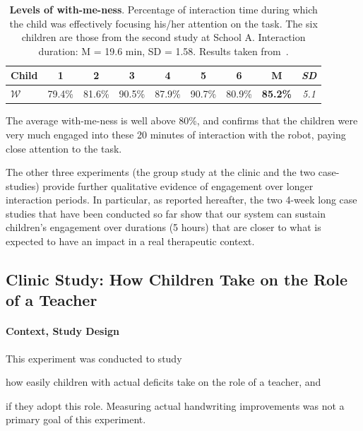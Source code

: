 \documentclass{article}
\begin{document}
\begin{table}[h!]
    \centering
    \caption{\textbf{Levels of with-me-ness}. Percentage of interaction time
        during which the child was effectively focusing his/her attention on the
        task. The six children are those from the second study at School A.
        Interaction duration: M = 19.6 min, SD = 1.58. Results
        taken from~\cite{lemaignan2016realtime}.}

    \begin{tabular}{p{1cm}cccccccc}
        \toprule
        \bf Child & 1 & 2 & 3 & 4 & 5 & 6 & {\bf M} & {\it SD} \\
        \midrule
        $\mathcal{W}$ & 79.4\% & 81.6\%  & 90.5\% & 87.9\% & 90.7\% & 80.9\% & {\bf 85.2\%} & {\it 5.1} \\ 
        \bottomrule
    \end{tabular}
    \label{tab:results-with-me-ness}
\end{table}

The average with-me-ness is well above 80\%, and confirms that the children
were very much engaged into these 20 minutes of interaction with the robot,
paying close attention to the task.

The other three experiments (the group study at the clinic and the two
case-studies) provide further qualitative evidence of engagement over longer
interaction periods. In particular, as reported hereafter, the two 4-week long
case studies that have been conducted so far show that our system can sustain
children's engagement over durations (5 hours) that are closer to what is
expected to have an impact in a real therapeutic context.

\subsection{Clinic Study: How Children Take on the Role of a Teacher}\label{normandie}
\label{study_normandy}

\paragraph{Context, Study Design}

\begin{inparaenum}[\itshape 1\upshape)]
This experiment was conducted to study \item how easily children with actual
deficits take on the role of a teacher, and \item if they adopt this role.
Measuring actual handwriting improvements was not a primary goal of this
experiment.
\end{inparaenum}
\end{document}
